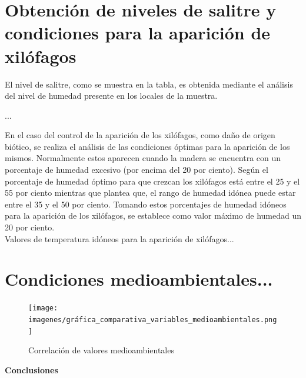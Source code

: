 
    \section{Obtención de niveles de salitre y condiciones para la aparición de xilófagos}

    El nivel de salitre, como se muestra en la tabla, es obtenida mediante el análisis del nivel de humedad presente en los locales de la muestra.
    
    ...

    En el caso del control de la aparición de los xilófagos, como daño de origen biótico, se realiza el análisis de las condiciones óptimas para la aparición de los mismos. Normalmente estos aparecen cuando la madera se encuentra con un porcentaje de humedad excesivo (por encima del 20 por ciento). Según \cite{monitoringMoisture} \cite{rodriguezcodigo} el porcentaje de humedad óptimo para que crezcan los xilófagos está entre el 25 y el 55 por ciento mientras que \cite{woodPreservation} plantea que, el rango de humedad idónea puede estar entre el 35 y el 50 por ciento. Tomando estos porcentajes de humedad idóneos para la aparición de los xilófagos, se establece como valor máximo de humedad un 20 por ciento.\\

    Valores de temperatura idóneos para la aparición de xilófagos...

    \section{Condiciones medioambientales...} \label{sec: condiciones_medioambientales}


    \begin{figure}[h]
        \centering
        \texttt{[image: imagenes/gráfica\_comparativa\_variables\_medioambientales.png]}
        \caption{Correlación de valores medioambientales}
        \label{imag:grafica_condiciones_medioambientales}
    \end{figure}



    \textbf{\Large Conclusiones}\newline
